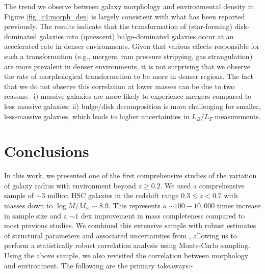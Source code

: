 The trend we observe between galaxy morphology and environmental density in Figure \ref{fig_c4:morph_den} is largely consistent with what has been reported previously. The results indicate that the transformation of (star-forming) disk-dominated galaxies into (quiescent) bulge-dominated galaxies occur at an accelerated rate in denser environments. Given that various effects responsible for such a transformation (e.g., mergers, ram pressure stripping, gas strangulation) are more prevalent in denser environments, it is not surprising that we observe the rate of morphological transformation to be more in denser regions. The fact that we do not observe this correlation at lower masses can be due to two reasons:- i) massive galaxies are more likely to experience mergers compared to less massive galaxies; ii) bulge/disk decomposition is more challenging for smaller, less-massive galaxies, which leads to higher uncertainties in $L_B/L_T$ measurements. 

\section{Conclusions} \label{sec_c4:conclusions}

In this work, we presented one of the first comprehensive studies of the variation of galaxy radius with environment beyond $z \geq 0.2$. We used a comprehensive sample of $\sim3$ million HSC galaxies in the redshift range $0.3 \leq z < 0.7$ with masses down to $\log M/M_{\odot}\sim8.9$. This represents a $\sim100-10,000$ times increase in sample size and a $\sim1$ dex improvement in mass completeness compared to most previous studies. We combined this extensive sample with robust estimates of structural parameters and associated uncertainties from \gampen{}, allowing us to perform a statistically robust correlation analysis using Monte-Carlo sampling.  Using the above sample, we also revisited the correlation between morphology and environment. The following are the primary takeaways:- 

